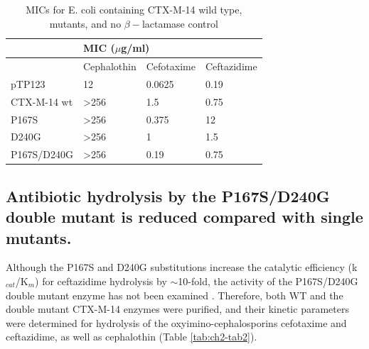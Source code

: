 \documentclass[../main.tex]{subfiles}
\begin{document}
        \begin{table}[]
        \centering
        \caption[MICs for E. coli containing CTX-M-14 wild type, mutants, and no $\beta-$lactamase control]{MICs for E. coli containing CTX-M-14 wild type, mutants, and no $\beta-$lactamase control}
        \label{tab:ch2-tab1}
        \begin{tabular}{|l|l|l|l|}
        \hline
                    & \multicolumn{3}{l|}{MIC ($\mu$g/ml)}         \\ \hline
                    & Cephalothin       & Cefotaxime & Ceftazidime \\ \hline
        pTP123      & 12                & 0.0625     & 0.19        \\ \hline
        CTX-M-14 wt & \textgreater{}256 & 1.5        & 0.75        \\ \hline
        P167S       & \textgreater{}256 & 0.375      & 12          \\ \hline
        D240G       & \textgreater{}256 & 1          & 1.5         \\ \hline
        P167S/D240G & \textgreater{}256 & 0.19       & 0.75        \\ \hline
        \end{tabular}
        \end{table}

    \subsection{Antibiotic hydrolysis by the P167S/D240G double mutant is reduced compared with single mutants.}

        Although the P167S and D240G substitutions increase the catalytic efficiency (k$_{cat}$/K$_{m}$) for ceftazidime hydrolysis by $\sim$10-fold, the activity of the P167S/D240G double mutant enzyme has not been examined \cite{patel_characterization_2015,bonnet_effect_2003,kimura_role_2004,ishii_biochemical_2007}. Therefore, both WT and the double mutant CTX-M-14 enzymes were purified, and their kinetic parameters were determined for hydrolysis of the oxyimino-cephalosporins cefotaxime and ceftazidime, as well as cephalothin (Table \ref{tab:ch2-tab2}).
\end{document}
